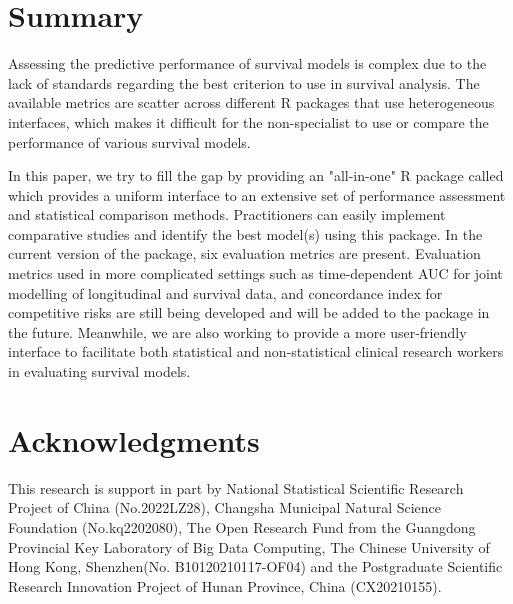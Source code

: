 \section{Summary}

Assessing the predictive performance of survival models is complex due to the lack of standards regarding the best criterion to use in survival analysis. The available metrics are scatter across different R packages that use heterogeneous interfaces, which makes it difficult for the non-specialist to  use or compare the performance of various survival models.

In this paper, we try to fill the gap by providing an "all-in-one" R package called  which provides a uniform interface to an extensive set of performance assessment and statistical comparison methods. Practitioners can easily implement comparative studies and identify the best model(s) using this package. In the current version of the  package, six  evaluation metrics are present. Evaluation metrics used in more complicated settings such as time-dependent AUC for joint modelling of longitudinal and survival data, and concordance index for competitive risks are still being developed and will be added to the   package in the future. Meanwhile, we are also working to provide a more user-friendly interface to facilitate both statistical and non-statistical clinical research workers in evaluating survival models.

\section{Acknowledgments}
This research is support in part by National Statistical Scientific Research Project of China (No.2022LZ28), Changsha Municipal Natural Science Foundation (No.kq2202080), The Open Research Fund from the Guangdong Provincial Key Laboratory of Big Data Computing, The Chinese University of Hong Kong, Shenzhen(No. B10120210117-OF04) and the Postgraduate Scientific Research Innovation Project of Hunan Province, China (CX20210155).




